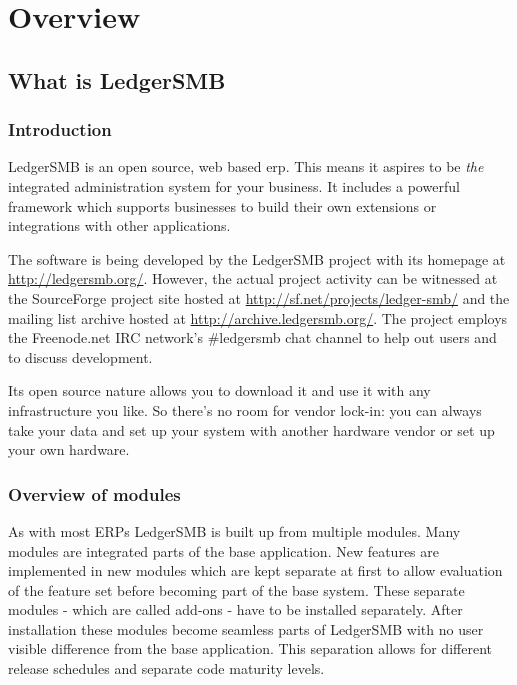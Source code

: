 
\part{Overview}



\chapter{What is LedgerSMB}

\section{Introduction}
LedgerSMB is an open source, web based \gls{erp}. This means it aspires to be
\textit{the} integrated administration system for your business. It includes a
powerful framework which supports businesses to build their own extensions or
integrations with other applications.

The software is being developed by the LedgerSMB project with its homepage at \url{http://ledgersmb.org/}.
However, the actual project activity can be witnessed at the SourceForge
project site hosted at \url{http://sf.net/projects/ledger-smb/} and the mailing list archive
hosted at \url{http://archive.ledgersmb.org/}.  The project
employs the Freenode.net IRC network's \#ledgersmb chat channel to help out users and to discuss
development.

Its open source nature allows you to download it and use it with any
infrastructure you like. So there's no room for vendor lock-in: you can
always take your data and set up your system with another hardware vendor
or set up your own hardware.

\section{Overview of modules}
\label{sec:ModuleOverview}
As with most ERPs LedgerSMB is built up from multiple modules.  Many modules are
integrated parts of the base application.  New features are implemented in new
modules which are kept separate at first to allow
evaluation of the feature set before becoming part of the base system. These separate
modules - which are called \glspl{add-on} - have to be installed separately. After installation
these modules become seamless parts of LedgerSMB with no user visible difference from the base
application. This separation allows for different release schedules
and separate code maturity levels.


